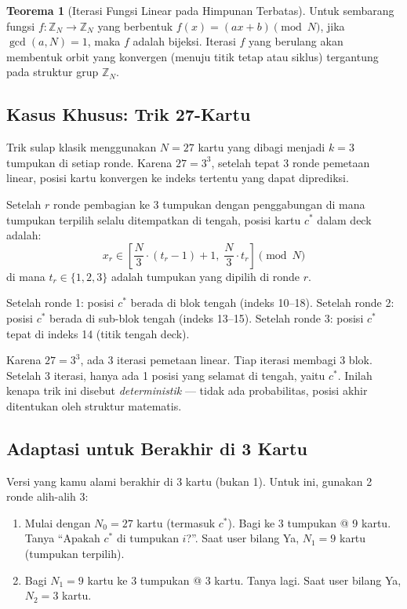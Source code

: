 \documentclass[11pt,a4paper]{article}
\theoremstyle{definition}
\newtheorem{teorema}{Teorema}[section]
\begin{document}
\begin{teorema}[Iterasi Fungsi Linear pada Himpunan Terbatas]
Untuk sembarang fungsi $f: \mathbb{Z}_N \to \mathbb{Z}_N$ yang berbentuk $f(x) = (ax + b) \pmod{N}$, jika $\gcd(a, N) = 1$, maka $f$ adalah bijeksi. Iterasi $f$ yang berulang akan membentuk orbit yang konvergen (menuju titik tetap atau siklus) tergantung pada struktur grup $\mathbb{Z}_N$.
\end{teorema}

\subsection{Kasus Khusus: Trik 27-Kartu}

Trik sulap klasik menggunakan $N = 27$ kartu yang dibagi menjadi $k = 3$ tumpukan di setiap ronde. Karena $27 = 3^3$, setelah tepat 3 ronde pemetaan linear, posisi kartu konvergen ke indeks tertentu yang dapat diprediksi.

\begin{rumusbox}
Setelah $r$ ronde pembagian ke 3 tumpukan dengan penggabungan di mana tumpukan terpilih selalu ditempatkan di tengah, posisi kartu $c^*$ dalam deck adalah:
\[
x_r \in \left[ \frac{N}{3} \cdot (t_r - 1) + 1,\; \frac{N}{3} \cdot t_r \right] \pmod{N}
\]
di mana $t_r \in \{1, 2, 3\}$ adalah tumpukan yang dipilih di ronde $r$.
\end{rumusbox}

Setelah ronde 1: posisi $c^*$ berada di blok tengah (indeks 10--18).
Setelah ronde 2: posisi $c^*$ berada di sub-blok tengah (indeks 13--15).
Setelah ronde 3: posisi $c^*$ tepat di indeks 14 (titik tengah deck).

\begin{insightbox}
Karena $27 = 3^3$, ada 3 iterasi pemetaan linear. Tiap iterasi membagi 3 blok. Setelah 3 iterasi, hanya ada 1 posisi yang selamat di tengah, yaitu $c^*$. Inilah kenapa trik ini disebut \emph{deterministik} --- tidak ada probabilitas, posisi akhir ditentukan oleh struktur matematis.
\end{insightbox}

\subsection{Adaptasi untuk Berakhir di 3 Kartu}

Versi yang kamu alami berakhir di 3 kartu (bukan 1). Untuk ini, gunakan 2 ronde alih-alih 3:

\begin{enumerate}[label=\textbf{Ronde \arabic*.}, leftmargin=*]
    \item Mulai dengan $N_0 = 27$ kartu (termasuk $c^*$). Bagi ke 3 tumpukan @ 9 kartu. Tanya ``Apakah $c^*$ di tumpukan $i$?''. Saat user bilang Ya, $N_1 = 9$ kartu (tumpukan terpilih).
    \item Bagi $N_1 = 9$ kartu ke 3 tumpukan @ 3 kartu. Tanya lagi. Saat user bilang Ya, $N_2 = 3$ kartu.
\end{enumerate}
\end{document}
